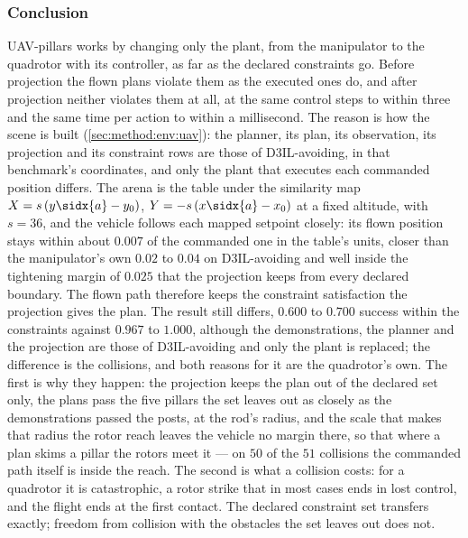 \subsubsection{Conclusion}\label{sec:res:uav:pillars:conclusion}

UAV-pillars works by changing only the plant, from the manipulator to the quadrotor with its controller,
as far as the declared constraints go. Before projection the flown plans violate them as the executed ones
do, and after projection neither violates them at all, at the same control steps to within three and the
same time per action to within a millisecond. The reason is how the scene is built
(\autoref{sec:method:env:uav}): the planner, its plan, its observation, its projection and its constraint
rows are those of D3IL-avoiding, in that benchmark's coordinates, and only the plant that executes each
commanded position differs. The arena is the table under the similarity map
$X = s\,(y\sidx{a}-y_{0})$, $Y = -s\,(x\sidx{a}-x_{0})$ at a fixed altitude, with $s = 36$, and the
vehicle follows each mapped setpoint closely: its flown position stays within about $0.007$ of the
commanded one in the table's units, closer than the manipulator's own $0.02$ to $0.04$ on D3IL-avoiding
and well inside the tightening margin of $0.025$ that the projection keeps from every declared boundary.
The flown path therefore keeps the constraint satisfaction the projection gives the plan.
The result still differs, $0.600$ to $0.700$ success within the constraints against $0.967$ to $1.000$,
although the demonstrations, the planner and the projection are those of D3IL-avoiding and only the plant is
replaced; the difference is the collisions, and both reasons for it are the quadrotor's own. The first is
why they happen: the projection keeps the plan out of the declared set only, the plans pass the five pillars
the set leaves out as closely as the demonstrations passed the posts, at the rod's radius, and the scale
that makes that radius the rotor reach leaves the vehicle no margin there, so that where a plan skims a
pillar the rotors meet it --- on $50$ of the $51$ collisions the commanded path itself is inside the reach.
The second is what a collision costs: for a quadrotor it is catastrophic, a rotor strike that in most cases
ends in lost control, and the flight ends at the first contact. The declared constraint set transfers
exactly; freedom from collision with the obstacles the set leaves out does not.

